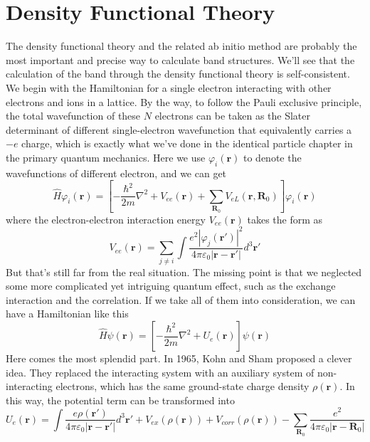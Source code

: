 \documentclass{article}
\begin{document}
\section{Density Functional Theory}
The density functional theory and the related ab initio method are probably the most important and precise way to calculate band structures. We'll see that the calculation of the band through the density functional theory is self-consistent. We begin with the Hamiltonian for a single electron interacting with other electrons and ions in a lattice. By the way, to follow the Pauli exclusive principle, the total wavefunction of these $N$ electrons can be taken as the Slater determinant of different single-electron wavefunction that equivalently carries a $-e$ charge, which is exactly what we've done in the identical particle chapter in the primary quantum mechanics. Here we use $\varphi_i(\mathbf{r})$ to denote the wavefunctions of different electron, and we can get\begin{equation}
    \hat{H}\varphi_i(\mathbf{r})=[-\frac{\hbar^2}{2m}\nabla^2+V_{ee}(\mathbf{r})+\sum_{\mathbf{R}_0}V_{eL}(\mathbf{r},\mathbf{R}_0)]\varphi_i(\mathbf{r})
\end{equation}where the electron-electron interaction energy $V_{ee}(\mathbf{r})$ takes the form as\begin{equation}
    V_{ee}(\mathbf{r})=\sum_{j\neq{i}}\int\frac{e^2|\varphi_j(\mathbf{r}')|^2}{4\pi\varepsilon_0|\mathbf{r}-\mathbf{r}'|}d^3\mathbf{r}'
\end{equation}But that's still far from the real situation. The missing point is that we neglected some more complicated yet intriguing quantum effect, such as the exchange interaction and the correlation. If we take all of them into consideration, we can have a Hamiltonian like this\begin{equation}
    \hat{H}\psi(\mathbf{r})=[-\frac{\hbar^2}{2m}\nabla^2+U_e(\mathbf{r})]\psi(\mathbf{r})
\end{equation}Here comes the most splendid part. In 1965, Kohn and Sham proposed a clever idea. They replaced the interacting system with an auxiliary system of non-interacting electrons, which has the same ground-state charge density $\rho(\mathbf{r})$. In this way, the potential term can be transformed into\begin{equation}
    U_e(\mathbf{r})=\int\frac{e\rho(\mathbf{r}')}{4\pi\varepsilon_0|\mathbf{r}-\mathbf{r}'|}d^3\mathbf{r}'+V_{ex}(\rho(\mathbf{r}))+V_{corr}(\rho(\mathbf{r}))-\sum_{\mathbf{R}_0}\frac{e^2}{4\pi\varepsilon_0|\mathbf{r}-\mathbf{R}_0|}

\end{equation}
\end{document}
